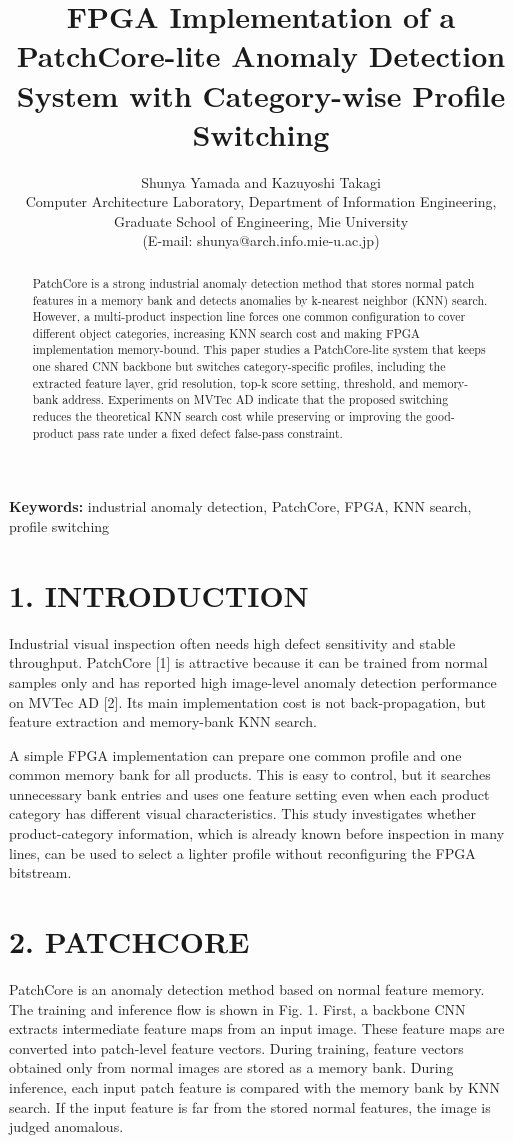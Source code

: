 \documentclass[a4paper,twocolumn,10pt]{article}
\title{\textbf{FPGA Implementation of a PatchCore-lite Anomaly Detection System with Category-wise Profile Switching}}
\author{Shunya Yamada and Kazuyoshi Takagi\\ Computer Architecture Laboratory, Department of Information Engineering, Graduate School of Engineering, Mie University\\ (E-mail: shunya@arch.info.mie-u.ac.jp)}
\date{}
\begin{document}
\maketitle
\begin{abstract}
PatchCore is a strong industrial anomaly detection method that stores normal patch features in a memory bank and detects anomalies by k-nearest neighbor (KNN) search. However, a multi-product inspection line forces one common configuration to cover different object categories, increasing KNN search cost and making FPGA implementation memory-bound. This paper studies a PatchCore-lite system that keeps one shared CNN backbone but switches category-specific profiles, including the extracted feature layer, grid resolution, top-k score setting, threshold, and memory-bank address. Experiments on MVTec AD indicate that the proposed switching reduces the theoretical KNN search cost while preserving or improving the good-product pass rate under a fixed defect false-pass constraint.
\end{abstract}
\noindent\textbf{Keywords:} industrial anomaly detection, PatchCore, FPGA, KNN search, profile switching
\section*{1. INTRODUCTION}
Industrial visual inspection often needs high defect sensitivity and stable throughput. PatchCore [1] is attractive because it can be trained from normal samples only and has reported high image-level anomaly detection performance on MVTec AD [2]. Its main implementation cost is not back-propagation, but feature extraction and memory-bank KNN search.

A simple FPGA implementation can prepare one common profile and one common memory bank for all products. This is easy to control, but it searches unnecessary bank entries and uses one feature setting even when each product category has different visual characteristics. This study investigates whether product-category information, which is already known before inspection in many lines, can be used to select a lighter profile without reconfiguring the FPGA bitstream.

\section*{2. PATCHCORE}
PatchCore is an anomaly detection method based on normal feature memory. The training and inference flow is shown in Fig. 1. First, a backbone CNN extracts intermediate feature maps from an input image. These feature maps are converted into patch-level feature vectors. During training, feature vectors obtained only from normal images are stored as a memory bank. During inference, each input patch feature is compared with the memory bank by KNN search. If the input feature is far from the stored normal features, the image is judged anomalous.
\end{document}
